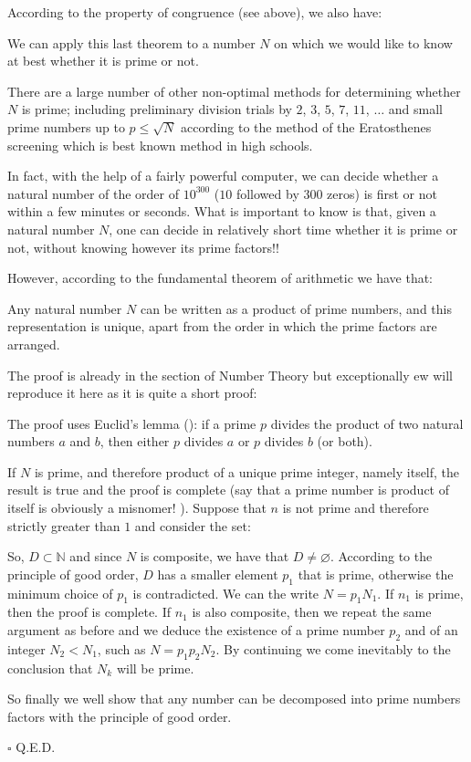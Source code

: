 	According to the property of congruence (see above), we also have:
	
	We can apply this last theorem to a number $N$ on which we would like to know at best whether it is prime or not.

	There are a large number of other non-optimal methods for determining whether $N$ is prime; including preliminary division trials by $2$, $3$, $5$, $7$, $11$, $\ldots$ and small prime numbers up to $p\leq\sqrt{N}$ according to the method of the Eratosthenes screening which is best known method in high schools.
	\begin{tcolorbox}[title=Remark,colframe=black,arc=10pt]
	In fact, with the help of a fairly powerful computer, we can decide whether a natural number of the order of $10^{300}$ ($10$ followed by $300$ zeros) is first or not within a few minutes or seconds. What is important to know is that, given a natural number $N$, one can decide in relatively short time whether it is prime or not, without knowing however its prime factors!!
	\end{tcolorbox}
	However, according to the fundamental theorem of arithmetic we have that:
	\begin{theorem}
	Any natural number $N$ can be written as a product of prime numbers, and this representation is unique, apart from the order in which the prime factors are arranged.
	\end{theorem}
	The proof is already in the section of Number Theory but exceptionally ew will reproduce it here as it is quite a short proof:
	\begin{dem}
	The proof uses Euclid's lemma (): if a prime $p$ divides the product of two natural numbers $a$ and $b$, then either $p$ divides $a$ or $p$ divides $b$ (or both).
	
	If $N$ is prime, and therefore product of a unique prime integer, namely itself, the result is true and the proof is complete (say that a prime number is product of itself is obviously a misnomer! ). Suppose that $n$ is not prime and therefore strictly greater than $1$ and consider the set:
	
	So, $D\subset \mathbb{N}$ and since $N$ is composite, we have that $D\neq \varnothing$. According to the principle of good order, $D$ has a smaller element $p_1$ that is prime, otherwise the minimum choice of $p_1$ is contradicted. We can the write $N=p_1N_1$. If $n_1$ is prime, then the proof is complete. If $n_1$ is also composite, then we repeat the same argument as before and we deduce the existence of a prime number $p_2$ and of an integer $N_2<N_1$, such as $N=p_1p_2N_2$. By continuing we come inevitably to the conclusion that $N_k$ will be prime.
	
	So finally we well show that any number can be decomposed into prime numbers factors with the principle of good order.
	\begin{flushright}
		$\square$  Q.E.D.
	\end{flushright}
	\end{dem}
